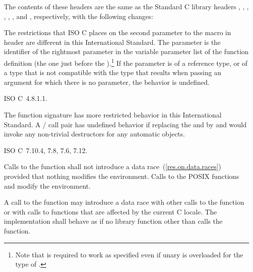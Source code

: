 \pnum
{}%
%
%
%
%
The contents of these headers are the same as the Standard C library headers
,
,
,
,
,
,
and
,
respectively, with the following changes:

\pnum
The restrictions that ISO C places on the second parameter to the
%
macro in header
%
are different in this International Standard.
The parameter
is the identifier of the rightmost parameter in the variable parameter list
of the function definition (the one just before the
).\footnote{Note that
is required to work as specified even if unary
is overloaded for the type of
.}
If the parameter
is of a reference type, or of a type that is not compatible with the
type that results when passing an argument for which there is no
parameter, the behavior is undefined.

\xref ISO C~4.8.1.1.

\pnum
The function signature
%
has more restricted behavior in this International Standard.
A / call pair has undefined
behavior if replacing the  and 
by  and  would invoke any non-trivial destructors for any automatic
objects.

\xref ISO C~7.10.4, 7.8, 7.6, 7.12.

\pnum
Calls to the function
%
 shall not introduce a data
race~(\ref{res.on.data.races}) provided that nothing modifies the environment.
\enternote Calls to the POSIX functions
%
 and
%
 modify the
environment. \exitnote

\pnum
A call to the  function may introduce a data race with other
calls to the  function or with calls to functions that are
affected by the current C locale. The implementation shall behave as if no
library function other than  calls the 
function.

